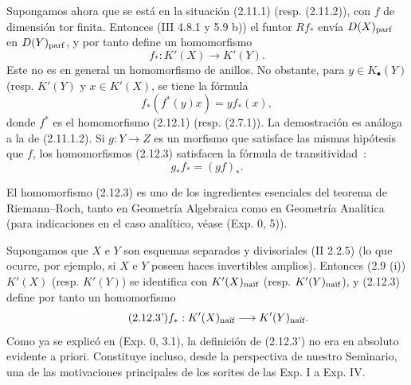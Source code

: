 Supongamos ahora que se está en la situación (2.11.1) (resp. (2.11.2)), con \(f\) de dimensión tor finita. Entonces (III 4.8.1 y 5.9 b)) el funtor \(Rf_*\) envía \(D(X)_{\parf}\) en \(D(Y)_{\parf}\), y por tanto define un homomorfismo
\begin{equation}\tag{2.12.3}
 f_*:K'(X)\longrightarrow K'(Y).
\end{equation}
Este no es en general un homomorfismo de anillos. No obstante, para \(y\in K_{\bullet}(Y)\) (resp. \(K'(Y)\)\sisi{}{)} y \(x\in K'(X)\), se tiene la fórmula
\begin{equation}\tag{2.12.4}
 f_*(f^*(y)x)=y f_*(x),
\end{equation}
donde \(f^*\) es el homomorfismo (2.12.1) (resp. (2.7.1)). La demostración es análoga a la de (2.11.1.2). Si \(g:Y\to Z\) es un morfismo que satisface las mismas hipótesis que \(f\), los homomorfismos (2.12.3) satisfacen la fórmula de transitividad~:
\begin{equation}\tag{2.12.3.1}
 g_*f_*=(gf)_*.
\end{equation}

El homomorfismo (2.12.3) es uno de los ingredientes esenciales del teorema de Riemann--Roch, tanto en Geometría Algebraica como en Geometría Analítica (para indicaciones en el caso analítico, véase (Exp. 0, 5)).

Supongamos que \(X\) e \(Y\) son esquemas separados y divisoriales (II 2.2.5) (lo que ocurre, por ejemplo, si \(X\) e \(Y\) poseen haces invertibles amplios). Entonces (2.9 (i)) \(K'(X)\) (resp. \(K'(Y)\)) se identifica con \(K'(X)_{\naif}\) (resp. \(K'(Y)_{\naif}\)), y (2.12.3) define por tanto un homomorfismo
\begin{equation}\tag{2.12.3'}
 f_*:K'(X)_{\naif}\longrightarrow K'(Y)_{\naif}.
\end{equation}
Como ya se explicó en (Exp. 0, 3.1), la definición de (2.12.3') no era en absoluto evidente a priori. Constituye incluso, desde la perspectiva de nuestro Seminario, una de las motivaciones principales de los sorites de las Exp. I a Exp. IV.

